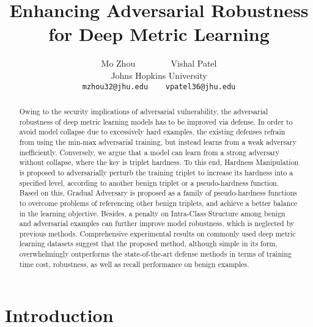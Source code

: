 \documentclass[10pt,twocolumn,letterpaper]{article}
\begin{document}
\title{Enhancing Adversarial Robustness for Deep Metric Learning}

\author{Mo Zhou ~~~~~~~ Vishal Patel\\
Johns Hopkins University\\
{\tt\small mzhou32@jhu.edu ~~ vpatel36@jhu.edu}
}
\maketitle

\begin{abstract}
	Owing to the security implications of adversarial vulnerability, the
	adversarial robustness of deep metric learning models has to be improved
	via defense.
	In order to avoid model collapse due to excessively hard examples, the
	existing defenses refrain from using the min-max adversarial training, but
	instead learns from a weak adversary inefficiently.
	Conversely, we argue that a model can learn from a strong adversary without
	collapse, where the key is triplet hardness.
	To this end, Hardness Manipulation is proposed to adversarially perturb the
	training triplet to increase its hardness into a specified level, according
	to another benign triplet or a pseudo-hardness function.
	Based on this, Gradual Adversary is proposed as a family of pseudo-hardness
	functions to overcome problems of referencing other benign triplets, and
	achieve a better balance in the learning objective.
	Besides, a penalty on Intra-Class Structure among benign and adversarial
	examples can further improve model robustness, which is neglected by
	previous methods.
	Comprehensive experimental results on commonly used deep metric
	learning datasets suggest that the proposed method, although simple in
	its form, overwhelmingly outperforms the state-of-the-art defense methods in
	terms of training time cost, robustness, as well as recall performance on
	benign examples.
%
\end{abstract}

\section{Introduction}
\label{sec:1}
\end{document}
